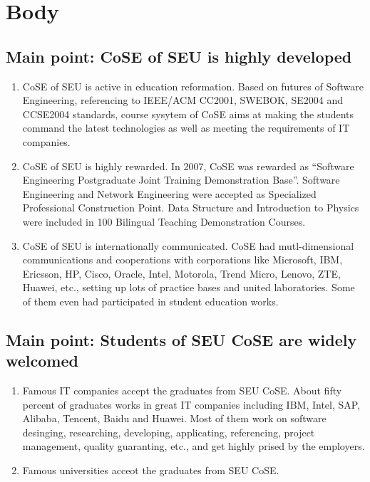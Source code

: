 \documentclass{article}
\begin{document}
    \section{Body}
    \subsection{Main point: CoSE of SEU is highly developed}

    \begin{enumerate}
        \item CoSE of SEU is active in education reformation. Based on futures of Software Engineering,
        referencing to IEEE/ACM CC2001, SWEBOK, SE2004 and CCSE2004 standards, course sysytem of CoSE
        aims at making the students command the latest technologies as well as meeting the
        requirements of IT companies. 
        \item CoSE of SEU is highly rewarded. In 2007, CoSE was rewarded as ``Software Engineering
        Postgraduate Joint Training Demonstration Base''. Software Engineering and Network Engineering
        were accepted as Specialized Professional Construction Point. Data Structure and Introduction
        to Physics were included in 100 Bilingual Teaching Demonstration Courses.
        \item CoSE of SEU is internationally communicated. CoSE had mutl-dimensional communications and
        cooperations with corporations like Microsoft, IBM, Ericsson, HP, Cisco, Oracle, Intel, Motorola,
        Trend Micro, Lenovo, ZTE, Huawei, etc., setting up lots of practice bases and united laboratories.
        Some of them even had participated in student education works.
    \end{enumerate}

    \subsection{Main point: Students of SEU CoSE are widely welcomed}

    \begin{enumerate}
        \item Famous IT companies accept the graduates from SEU CoSE. About fifty percent of graduates
        works in great IT companies including IBM, Intel, SAP, Alibaba, Tencent, Baidu and Huawei. Most
        of them work on software desinging, researching, developing, applicating, referencing, project
        management, quality guaranting, etc., and get highly prised by the employers.
        \item Famous universities acceot the graduates from SEU CoSE. 
    \end{enumerate}
\end{document}
